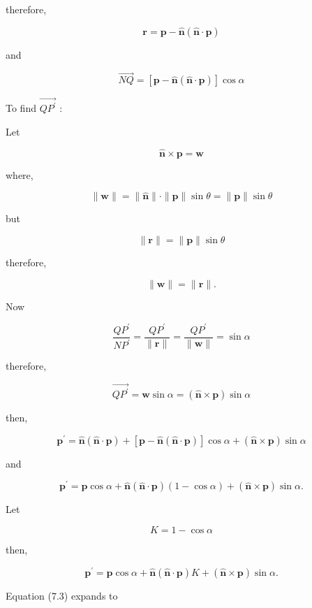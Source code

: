 \documentclass[10pt]{article}
\begin{document}
therefore,

$$
\mathbf{r}=\mathbf{p}-\hat{\mathbf{n}}(\hat{\mathbf{n}} \cdot \mathbf{p})
$$

and

$$
\overrightarrow{N Q}=[\mathbf{p}-\hat{\mathbf{n}}(\hat{\mathbf{n}} \cdot \mathbf{p})] \cos \alpha
$$

To find $\overrightarrow{Q P^{\prime}}$ :

Let

$$
\hat{\mathbf{n}} \times \mathbf{p}=\mathbf{w}
$$

where,

$$
\|\mathbf{w}\|=\|\hat{\mathbf{n}}\| \cdot\|\mathbf{p}\| \sin \theta=\|\mathbf{p}\| \sin \theta
$$

but

$$
\|\mathbf{r}\|=\|\mathbf{p}\| \sin \theta
$$

therefore,

$$
\|\mathbf{w}\|=\|\mathbf{r}\| .
$$

Now

$$
\frac{Q P^{\prime}}{N P^{\prime}}=\frac{Q P^{\prime}}{\|\mathbf{r}\|}=\frac{Q P^{\prime}}{\|\mathbf{w}\|}=\sin \alpha
$$

therefore,

$$
\overrightarrow{Q P^{\prime}}=\mathbf{w} \sin \alpha=(\hat{\mathbf{n}} \times \mathbf{p}) \sin \alpha
$$

then,

$$
\mathbf{p}^{\prime}=\hat{\mathbf{n}}(\hat{\mathbf{n}} \cdot \mathbf{p})+[\mathbf{p}-\hat{\mathbf{n}}(\hat{\mathbf{n}} \cdot \mathbf{p})] \cos \alpha+(\hat{\mathbf{n}} \times \mathbf{p}) \sin \alpha
$$

and

$$
\mathbf{p}^{\prime}=\mathbf{p} \cos \alpha+\hat{\mathbf{n}}(\hat{\mathbf{n}} \cdot \mathbf{p})(1-\cos \alpha)+(\hat{\mathbf{n}} \times \mathbf{p}) \sin \alpha .
$$

Let

$$
K=1-\cos \alpha
$$

then,

$$
\mathbf{p}^{\prime}=\mathbf{p} \cos \alpha+\hat{\mathbf{n}}(\hat{\mathbf{n}} \cdot \mathbf{p}) K+(\hat{\mathbf{n}} \times \mathbf{p}) \sin \alpha .
$$

Equation (7.3) expands to
\end{document}
